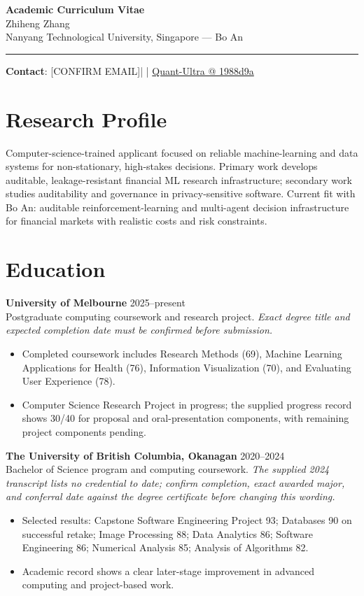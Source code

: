 \documentclass[11pt]{article}
\makeatletter
\newcommand{\ApplicantName}{Zhiheng Zhang}
\newcommand{\ApplicantEmail}{[CONFIRM EMAIL]}
\newcommand{\ApplicantPhone}{[CONFIRM PHONE]}
\newcommand{\ApplicantGitHub}{\href{https://github.com/zhiheng-zhang-Mera/Quant-Ultra/tree/1988d9a8530da91a8158de864d098ea869098923}{Quant-Ultra @ 1988d9a}}
\makeatother
\begin{document}
\begin{center}
{\LARGE\bfseries Academic Curriculum Vitae}\\[0.25em]
{\large \ApplicantName}\\
Nanyang Technological University, Singapore --- Bo An
\end{center}
\vspace{0.35em}\hrule\vspace{0.65em}

\textbf{Contact}: \ApplicantEmail\quad | \quad \ApplicantPhone\quad | \quad \ApplicantGitHub

\section*{Research Profile}
Computer-science-trained applicant focused on reliable machine-learning and data systems for non-stationary, high-stakes decisions. Primary work develops auditable, leakage-resistant financial ML research infrastructure; secondary work studies auditability and governance in privacy-sensitive software. Current fit with Bo An: auditable reinforcement-learning and multi-agent decision infrastructure for financial markets with realistic costs and risk constraints.

\section*{Education}
\textbf{University of Melbourne} \hfill 2025--present\\
Postgraduate computing coursework and research project. \textit{Exact degree title and expected completion date must be confirmed before submission.}
\begin{itemize}
\item Completed coursework includes Research Methods (69), Machine Learning Applications for Health (76), Information Visualization (70), and Evaluating User Experience (78).
\item Computer Science Research Project in progress; the supplied progress record shows 30/40 for proposal and oral-presentation components, with remaining project components pending.
\end{itemize}

\textbf{The University of British Columbia, Okanagan} \hfill 2020--2024\\
Bachelor of Science program and computing coursework. \textit{The supplied 2024 transcript lists no credential to date; confirm completion, exact awarded major, and conferral date against the degree certificate before changing this wording.}
\begin{itemize}
\item Selected results: Capstone Software Engineering Project 93; Databases 90 on successful retake; Image Processing 88; Data Analytics 86; Software Engineering 86; Numerical Analysis 85; Analysis of Algorithms 82.
\item Academic record shows a clear later-stage improvement in advanced computing and project-based work.
\end{itemize}
\end{document}
